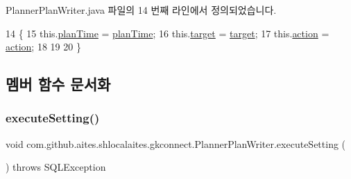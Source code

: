 Planner\+Plan\+Writer.\+java 파일의 14 번째 라인에서 정의되었습니다.


\begin{DoxyCode}
14                                                                            \{
15         this.\mbox{\hyperlink{classcom_1_1github_1_1aites_1_1shlocalaites_1_1gkconnect_1_1_planner_plan_writer_ad6cb43e87aa18f5f2a27f8adb848ba3e}{planTime}} = \mbox{\hyperlink{classcom_1_1github_1_1aites_1_1shlocalaites_1_1gkconnect_1_1_planner_plan_writer_ad6cb43e87aa18f5f2a27f8adb848ba3e}{planTime}};
16         this.\mbox{\hyperlink{classcom_1_1github_1_1aites_1_1shlocalaites_1_1gkconnect_1_1_planner_plan_writer_aba8faa2341be4a8571453df2ee7144ab}{target}} = \mbox{\hyperlink{classcom_1_1github_1_1aites_1_1shlocalaites_1_1gkconnect_1_1_planner_plan_writer_aba8faa2341be4a8571453df2ee7144ab}{target}};
17         this.\mbox{\hyperlink{classcom_1_1github_1_1aites_1_1shlocalaites_1_1gkconnect_1_1_planner_plan_writer_ac126c52b58b3cca2aa2189e0a2d42979}{action}} = \mbox{\hyperlink{classcom_1_1github_1_1aites_1_1shlocalaites_1_1gkconnect_1_1_planner_plan_writer_ac126c52b58b3cca2aa2189e0a2d42979}{action}};
18     
19         
20     \}
\end{DoxyCode}


\subsection{멤버 함수 문서화}
\mbox{\label{classcom_1_1github_1_1aites_1_1shlocalaites_1_1gkconnect_1_1_planner_plan_writer_ae6d4ec4f52caf8f52c1d4ef28798c70f}} 
\subsubsection{\texorpdfstring{execute\+Setting()}{executeSetting()}}
{\footnotesize\ttfamily void com.\+github.\+aites.\+shlocalaites.\+gkconnect.\+Planner\+Plan\+Writer.\+execute\+Setting (\begin{DoxyParamCaption}{ }\end{DoxyParamCaption}) throws S\+Q\+L\+Exception}



